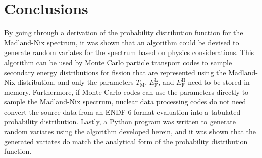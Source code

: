 \documentclass[final,leqno,onefignum,onetabnum]{siamltex1213}
\newcommand{\tmax}{T_{\mathrm{M}}}
\newcommand{\efl}{E_{\mathrm{F}}^{\mathrm{L}}}
\newcommand{\efh}{E_{\mathrm{F}}^{\mathrm{H}}}
\begin{document}
\section{Conclusions}

By going through a derivation of the probability distribution function for the
Madland-Nix spectrum, it was shown that an algorithm could be devised to
generate random variates for the spectrum based on physics considerations. This
algorithm can be used by Monte Carlo particle transport codes to sample
secondary energy distributions for fission that are represented using the
Madland-Nix distribution, and only the parameters $\tmax$, $\efl$, and $\efh$
need to be stored in memory. Furthermore, if Monte Carlo codes can use the
parameters directly to sample the Madland-Nix spectrum, nuclear data processing
codes do not need convert the source data from an ENDF-6 format evaluation into
a tabulated probability distribution. Lastly, a Python program was written to
generate random variates using the algorithm developed herein, and it was shown
that the generated variates do match the analytical form of the probability
distribution function.




\end{document}

